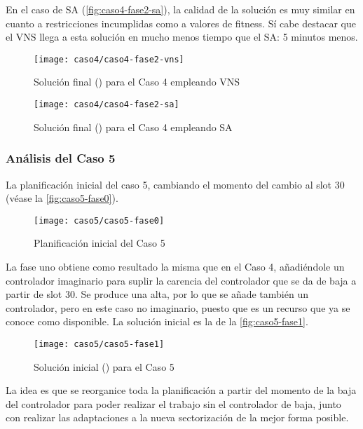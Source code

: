 En el caso de SA (\autoref{fig:caso4-fase2-sa}), la calidad de la solución es muy similar en cuanto a restricciones incumplidas como a valores de fitness. Sí cabe destacar que el VNS llega a esta solución en mucho menos tiempo que el SA: 5 minutos menos.

\begin{figure}[!]
	\centering
	\texttt{[image: caso4/caso4-fase2-vns]}
	\caption{Solución final (\fasedos{}) para el Caso 4 empleando VNS}
	\label{fig:caso4-fase2-vns}
\end{figure}

\begin{figure}[!]
	\centering
	\texttt{[image: caso4/caso4-fase2-sa]}
	\caption{Solución final (\fasedos{}) para el Caso 4 empleando SA}
	\label{fig:caso4-fase2-sa}
\end{figure}

\subsubsection{Análisis del Caso 5}

La planificación inicial del caso 5, cambiando el momento del cambio al slot 30 (véase la \autoref{fig:caso5-fase0}).

\begin{figure}[!]
	\centering
	\texttt{[image: caso5/caso5-fase0]}
	\caption{Planificación inicial del Caso 5}
	\label{fig:caso5-fase0}
\end{figure}

La fase uno obtiene como resultado la misma que en el Caso 4, añadiéndole un controlador imaginario para suplir la carencia del controlador que se da de baja a partir de slot 30. Se produce una alta, por lo que se añade también un controlador, pero en este caso no imaginario, puesto que es un recurso que ya se conoce como disponible. La solución inicial es la de la \autoref{fig:caso5-fase1}.

\begin{figure}[!]
	\centering
	\texttt{[image: caso5/caso5-fase1]}
	\caption{Solución inicial (\faseuno{}) para el Caso 5}
	\label{fig:caso5-fase1}
\end{figure}

La idea es que se reorganice toda la planificación a partir del momento de la baja del controlador para poder realizar el trabajo sin el controlador de baja, junto con realizar las adaptaciones a la nueva sectorización de la mejor forma posible.

